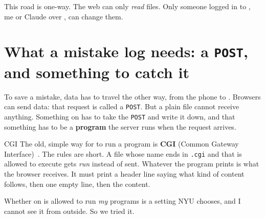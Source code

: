 \documentclass[11pt,a4paper]{article}
\newcommand{\yuanyi}{\toneD{願}\toneD{意}}
\newcommand{\yuanyin}{\toneB{原}\toneA{因}}
\begin{document}
This road is one-way. The web can only \emph{read} files. Only someone logged in to , me or Claude over , can change them.

\section{What a mistake log needs: a \texttt{POST}, and something to catch it}

To save a mistake, data has to travel the other way, from the phone to . Browsers can send data: that request is called a \texttt{POST}. But a plain file cannot receive anything. Something on  has to take the \texttt{POST} and write it down, and that something has to be a \textbf{program} the server runs when the request arrives.

\begin{center}
\end{center}

\begin{insight}{CGI}
The old, simple way for  to run a program is \textbf{CGI} (Common Gateway Interface)~\cite[\textit{What's a Server-Side CGI Script?}, p.~1126]{lutz}. The rules are short. A file whose name ends in \texttt{.cgi} and that is allowed to execute gets \emph{run} instead of sent. Whatever the program prints is what the browser receives. It must print a header line saying what kind of content follows, then one empty line, then the content.
\end{insight}

Whether  on  is allowed to run \emph{my} programs is a setting NYU chooses, and I cannot see it from outside. So we tried it.
\end{document}
